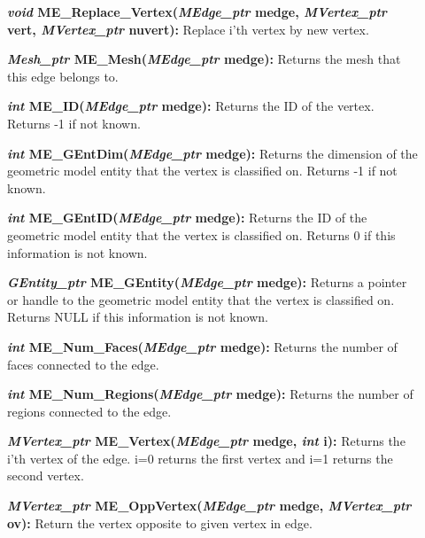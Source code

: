 \documentclass[12pt]{article}
\begin{document}
\begin{description}
\item[]\textbf{\textit{void} ME\_Replace\_Vertex(\textit{MEdge\_ptr}
    medge, \textit{MVertex\_ptr} vert, \textit{MVertex\_ptr} nuvert):}
  Replace i'th vertex by new vertex.

\item[]
  
\item[]\textbf{\textit{Mesh\_ptr} ME\_Mesh(\textit{MEdge\_ptr}
    medge):} Returns the mesh that this edge belongs to.
  
\item[]\textbf{\textit{int} ME\_ID(\textit{MEdge\_ptr} medge):}
  Returns the ID of the vertex. Returns -1 if not known.
  
\item[]\textbf{\textit{int} ME\_GEntDim(\textit{MEdge\_ptr} medge):}
  Returns the dimension of the geometric model entity that the vertex
  is classified on. Returns -1 if not known.
  
\item[]\textbf{\textit{int} ME\_GEntID(\textit{MEdge\_ptr} medge):}
  Returns the ID of the geometric model entity that the vertex is
  classified on.  Returns 0 if this information is not known.
  
\item[]\textbf{\textit{GEntity\_ptr} ME\_GEntity(\textit{MEdge\_ptr}
    medge):} Returns a pointer or handle to the geometric model entity
  that the vertex is classified on. Returns NULL if this information
  is not known.

\item[]
  
\item[]\textbf{\textit{int} ME\_Num\_Faces(\textit{MEdge\_ptr}
    medge):} Returns the number of faces connected to the edge.
  
\item[]\textbf{\textit{int} ME\_Num\_Regions(\textit{MEdge\_ptr}
    medge):} Returns the number of regions connected to the edge.
  
\item[]\textbf{\textit{MVertex\_ptr} ME\_Vertex(\textit{MEdge\_ptr}
    medge, \textit{int} i):} Returns the i'th vertex of the edge. i=0
  returns the first vertex and i=1 returns the second vertex.
  
\item[]\textbf{\textit{MVertex\_ptr} ME\_OppVertex(\textit{MEdge\_ptr}
    medge, \textit{MVertex\_ptr} ov):} Return the vertex opposite to
  given vertex in edge.
  

\end{description}
\end{document}
